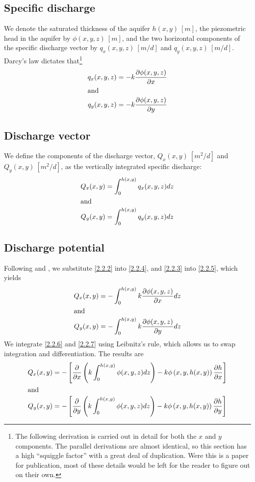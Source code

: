 \documentclass[12pt]{report}
\providecommand{\pderiv}[2]{\frac{\mathinner{\partial#1}}{\mathinner{\partial#2}}}
\begin{document}
\subsection{Specific discharge}
We denote the saturated thickness of the aquifer $h(x,y)~[m]$, the piezometric head in the aquifer by $\phi(x,y,z)~[m]$, and the two horizontal components of the specific discharge vector by $q_x(x,y,z)~[m/d]$ and $q_y(x,y,z)~[m/d]$. Darcy's law dictates that\footnote{The following derivation is carried out in detail for both the $x$ and $y$ components. The parallel derivations are almost identical, so this section has a high ``squiggle factor'' with a great deal of duplication. Were this is a paper for publication, most of these details would be left for the reader to figure out on their own.}
%
\begin{align}
    q_x(x,y,z) &= -k \pderiv{\phi(x,y,z)}{x} \label{2.2.2}\\
    \intertext{and}
    q_y(x,y,z) &= -k \pderiv{\phi(x,y,z)}{y} \label{2.2.3}
\end{align}

\subsection{Discharge vector}
We define the components of the discharge vector, $Q_x(x,y)~[m^2/d]$ and $Q_y(x,y)~[m^2/d]$, as the vertically integrated specific discharge:
%
\begin{align}
    Q_x(x,y) &= \int_{0}^{h(x,y)} q_x(x,y,z) dz \label{2.2.4}\\
    \intertext{and}
    Q_y(x,y) &= \int_{0}^{h(x,y)} q_y(x,y,z) dz \label{2.2.5}
\end{align}

\subsection{Discharge potential}
Following \citet[p. 77-78]{Bear1979, Bear2007} and \citet{Strack06}, we substitute \eqref{2.2.2} into \eqref{2.2.4}, and \eqref{2.2.3} into \eqref{2.2.5}, which yields
%
\begin{align}
    Q_x(x,y) &= -\int_{0}^{h(x,y)} k \pderiv{\phi(x,y,z)}{x} dz \label{2.2.6}\\
    \intertext{and}
    Q_y(x,y) &= -\int_{0}^{h(x,y)} k \pderiv{\phi(x,y,z)}{y} dz \label{2.2.7}
\end{align}
%
We integrate \eqref{2.2.6} and \eqref{2.2.7} using Leibnitz's rule, which allows us to swap integration and differentiation. The results are
%
\begin{align}
    Q_x(x,y) &= -\left[ \pderiv{}{x} \left(k \int_{0}^{h(x,y)} \phi(x,y,z) dz \right)
        - k\phi\left(x,y,h(x,y)\right) \pderiv{h}{x}  \right] \label{2.2.8}\\
        \intertext{and}
    Q_y(x,y) &= -\left[ \pderiv{}{y} \left(k \int_{0}^{h(x,y)} \phi(x,y,z) dz\right)
        - k\phi\left(x,y,h(x,y)\right) \pderiv{h}{y}  \right] \label{2.2.9}
\end{align}
\end{document}
